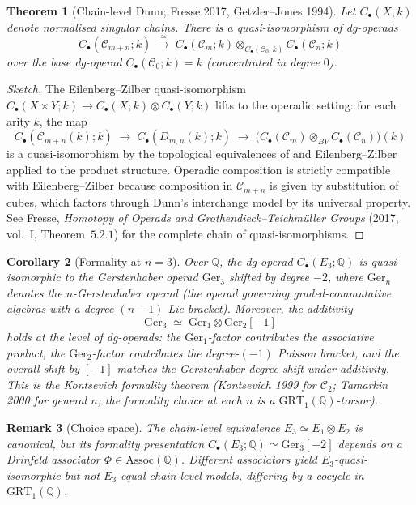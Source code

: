 \documentclass[11pt]{article}
\newtheorem{theorem}{Theorem}[section]
\newtheorem{corollary}[theorem]{Corollary}
\newtheorem{remark}[theorem]{Remark}
\newcommand{\Cube}{\mathscr{C}}
\newcommand{\Q}{\mathbb{Q}}
\newcommand{\Ger}{\mathrm{Ger}}
\begin{document}
\begin{theorem}[Chain-level Dunn; Fresse 2017, Getzler--Jones 1994]
\label{thm:chain-dunn}
Let $C_{\bullet}(X; k)$ denote normalised singular chains. There is a
quasi-isomorphism of dg-operads
\[
  C_{\bullet}(\Cube_{m + n}; k) \;\xrightarrow{\;\simeq\;}\;
  C_{\bullet}(\Cube_{m}; k) \otimes_{C_{\bullet}(\Cube_{0}; k)}
  C_{\bullet}(\Cube_{n}; k)
\]
over the base dg-operad $C_{\bullet}(\Cube_{0}; k) = k$ (concentrated in
degree $0$).
\end{theorem}

\begin{proof}[Sketch]
The Eilenberg--Zilber quasi-isomorphism
$C_{\bullet}(X \times Y; k) \to C_{\bullet}(X; k) \otimes C_{\bullet}(Y; k)$
lifts to the operadic setting: for each arity $k$, the map
\[
  C_{\bullet}(\Cube_{m + n}(k); k) \;\to\; C_{\bullet}(D_{m, n}(k); k)
  \;\to\; \bigl(C_{\bullet}(\Cube_{m}) \otimes_{BV}
  C_{\bullet}(\Cube_{n})\bigr)(k)
\]
is a quasi-isomorphism by the topological equivalences of
 and Eilenberg--Zilber applied to the
product structure. Operadic composition is strictly compatible with
Eilenberg--Zilber because composition in $\Cube_{m + n}$ is given by
substitution of cubes, which factors through Dunn's interchange model
by its universal property. See Fresse, \emph{Homotopy of Operads and
Grothendieck--Teichm\"uller Groups} (2017, vol.~I, Theorem~$5.2.1$)
for the complete chain of quasi-isomorphisms.
\end{proof}

\begin{corollary}[Formality at $n = 3$]
\label{cor:formality-e3}
Over $\Q$, the dg-operad $C_{\bullet}(E_{3}; \Q)$ is quasi-isomorphic
to the Gerstenhaber operad $\Ger_{3}$ shifted by degree $-2$, where
$\Ger_{n}$ denotes the $n$-Gerstenhaber operad (the operad governing
graded-commutative algebras with a degree-$(n - 1)$ Lie bracket).
Moreover, the additivity
\[
  \Ger_{3} \;\simeq\; \Ger_{1} \otimes \Ger_{2}[-1]
\]
holds at the level of dg-operads: the $\Ger_{1}$-factor contributes the
associative product, the $\Ger_{2}$-factor contributes the degree-$(-1)$
Poisson bracket, and the overall shift by $[-1]$ matches the
Gerstenhaber degree shift under additivity. This is the Kontsevich
formality theorem (Kontsevich 1999 for $\Cube_{2}$; Tamarkin 2000 for
general $n$; the formality choice at each $n$ is a
$\mathrm{GRT}_{1}(\Q)$-torsor).
\end{corollary}

\begin{remark}[Choice space]
The chain-level equivalence $E_{3} \simeq E_{1} \otimes E_{2}$ is
canonical, but its \emph{formality presentation}
$C_{\bullet}(E_{3}; \Q) \simeq \Ger_{3}[-2]$ depends on a Drinfeld
associator $\Phi \in \mathrm{Assoc}(\Q)$. Different associators yield
$E_{3}$-quasi-isomorphic but not $E_{3}$-equal chain-level models,
differing by a cocycle in $\mathrm{GRT}_{1}(\Q)$.
\end{remark}
\end{document}

